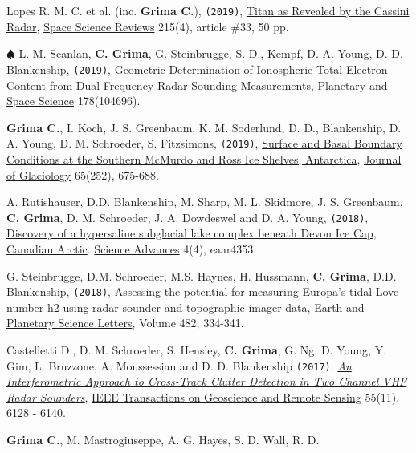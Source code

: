 \begin{etaremune}
\item
  Lopes R. M. C. et al. (inc. \textbf{Grima C.}), \texttt{(2019)}, \href{https://ui.adsabs.harvard.edu/abs/2019SSRv..215...33L/abstract}{Titan as Revealed by the Cassini Radar}, \ul{Space Science Reviews} 215(4), article \#33, 50 pp.
\item
  $\spadesuit$ L. M. Scanlan, \textbf{C. Grima}, G. Steinbrugge, S. D., Kempf, D. A. Young, D. D. Blankenship, \texttt{(2019)}, \href{https://www.sciencedirect.com/science/article/pii/S0032063319300820}{Geometric Determination of Ionospheric Total Electron Content from Dual Frequency Radar Sounding Measurements}, \ul{Planetary and Space Science} 178(104696).
\item
  \textbf{Grima C.}, I. Koch, J. S. Greenbaum, K. M. Soderlund, D. D., Blankenship, D. A. Young, D. M. Schroeder, S. Fitzsimons, \texttt{(2019)}, \href{https://www.cambridge.org/core/journals/journal-of-glaciology/article/surface-and-basal-boundary-conditions-at-the-southern-mcmurdo-and-ross-ice-shelves-antarctica/3ED3BFD465A3F6A5FC48342694F91EC5}{Surface and Basal Boundary Conditions at the Southern McMurdo and Ross Ice Shelves, Antarctica}, \ul{Journal of Glaciology} 65(252), 675-688.
\item
  A. Rutishauser, D.D. Blankenship, M. Sharp, M. L.
  Skidmore, J. S. Greenbaum, \textbf{C. Grima}, D. M. Schroeder, J. A.
  Dowdeswel and D. A. Young, \texttt{(2018)},
  \href{http://advances.sciencemag.org/content/4/4/eaar4353}{Discovery
  of a hypersaline subglacial lake complex beneath Devon Ice Cap,
  Canadian Arctic}. \ul{Science Advances} 4(4), eaar4353.
\item
  G. Steinbrugge, D.M. Schroeder, M.S. Haynes, H. Hussmann,
  \textbf{C. Grima}, D.D. Blankenship, \texttt{(2018)},
  \href{https://www.sciencedirect.com/science/article/pii/S0012821X17306647}{Assessing
  the potential for measuring Europa's tidal Love number h2 using radar
  sounder and topographic imager data}, \ul{Earth and Planetary Science
  Letters}, Volume 482, 334-341.
\item
  Castelletti D., D. M. Schroeder, S. Hensley, \textbf{C. Grima}, G. Ng,
  D. Young, Y. Gim, L. Bruzzone, A. Moussessian and D. D. Blankenship
  \texttt{(2017)}.
  \href{http://ieeexplore.ieee.org/abstract/document/8012547/}{\emph{An
  Interferometric Approach to Cross-Track Clutter Detection in Two
  Channel VHF Radar Sounders}}, \ul{IEEE Transactions on Geoscience and
  Remote Sensing} 55(11), 6128 - 6140.
\item
  \textbf{Grima C.}, M. Mastrogiuseppe, A. G. Hayes, S. D. Wall, R. D.

\end{etaremune}
